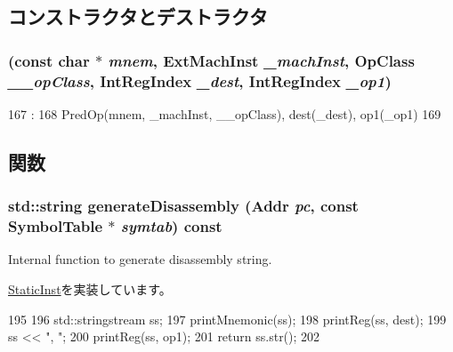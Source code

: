 \subsection{コンストラクタとデストラクタ}
\hypertarget{classRegRegOp_a527e1afe774e82a1e976cf3146421d69}{
\subsubsection[{RegRegOp}]{ (const char $\ast$ {\em mnem}, \/  {\bf ExtMachInst} {\em \_\-machInst}, \/  OpClass {\em \_\-\_\-opClass}, \/  {\bf IntRegIndex} {\em \_\-dest}, \/  {\bf IntRegIndex} {\em \_\-op1})}}
\label{classRegRegOp_a527e1afe774e82a1e976cf3146421d69}



\begin{DoxyCode}
167                                                   :
168         PredOp(mnem, _machInst, __opClass), dest(_dest), op1(_op1)
169     {}

\end{DoxyCode}


\subsection{関数}
\hypertarget{classRegRegOp_a95d323a22a5f07e14d6b4c9385a91896}{
\subsubsection[{generateDisassembly}]{\setlength{\rightskip}{0pt plus 5cm}std::string generateDisassembly ({\bf Addr} {\em pc}, \/  const SymbolTable $\ast$ {\em symtab}) const}}
\label{classRegRegOp_a95d323a22a5f07e14d6b4c9385a91896}
Internal function to generate disassembly string. 

\hyperlink{classStaticInst_ab4a569d2623620c04f8a52bbd91d63b9}{StaticInst}を実装しています。


\begin{DoxyCode}
195 {
196     std::stringstream ss;
197     printMnemonic(ss);
198     printReg(ss, dest);
199     ss << ", ";
200     printReg(ss, op1);
201     return ss.str();
202 }
\end{DoxyCode}


